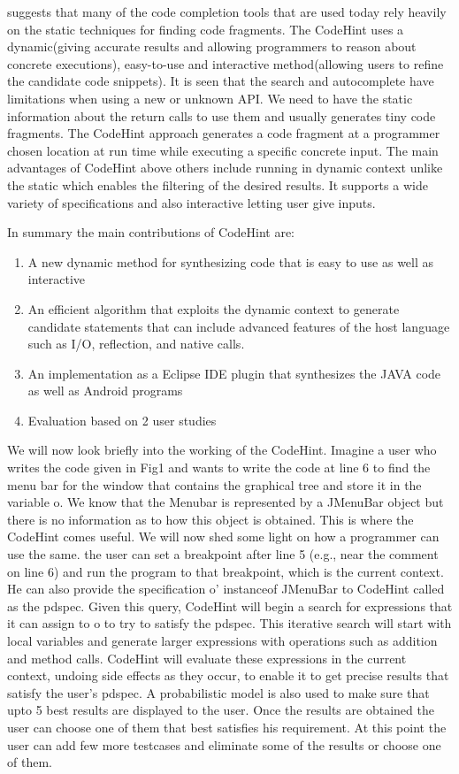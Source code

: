 \documentclass[10pt, conference, compsocconf]{IEEEtran}
\begin{document}
\cite{galenson2014codehint} suggests that many of the code completion tools that are used today rely heavily on the static techniques for finding code fragments. The CodeHint uses a dynamic(giving accurate results and allowing programmers to reason about concrete executions), easy-to-use and interactive method(allowing users to refine the candidate code snippets). It is seen that the search and autocomplete have limitations when using a new or unknown API. We need to have the static information about the return calls to use them and usually generates tiny code fragments. The CodeHint approach generates a code fragment at a programmer chosen location at run time while executing a specific concrete input. The main advantages of CodeHint above others include running in dynamic context unlike the static which enables the filtering of the desired results. It supports a wide variety of specifications and also interactive letting user give inputs.

In summary the main contributions of CodeHint are:
\begin{enumerate}
\item A new dynamic method for synthesizing code that is easy to use as well as interactive
\item An efficient algorithm that exploits the dynamic context to generate candidate statements that can include advanced features of the host language such as I/O, reflection, and native calls.
\item An implementation as a Eclipse IDE plugin that synthesizes the JAVA code as well as Android programs
\item Evaluation based on 2 user studies
\end{enumerate}


We will now look briefly into the working of the CodeHint. Imagine a user who writes the code given in Fig1 and wants to write the code at line 6 to find the menu bar for the window that contains the graphical tree and store it in the variable o. We know that the Menubar is represented by a JMenuBar object but there is no information as to how this object is obtained. This is where the CodeHint comes useful. We will now shed some light on how a programmer can use the same. the user can set a breakpoint after line 5 (e.g., near the comment on line 6) and run the program to that breakpoint, which is the current context. He can also provide the specification o' instanceof JMenuBar to CodeHint called as the pdspec. Given this query, CodeHint will begin a search for expressions that it can assign to o to try to satisfy the pdspec. This iterative search will start with local variables and generate larger expressions with operations such as addition and method calls. CodeHint will evaluate these expressions in the current context, undoing side effects as they occur, to enable it to get precise results that satisfy the user’s pdspec. A probabilistic model is also used to make sure that upto 5 best results are displayed to the user. Once the results are obtained the user can choose one of them that best satisfies his requirement. At this point the user can add few more testcases and eliminate some of the results or choose one of them.
\end{document}
